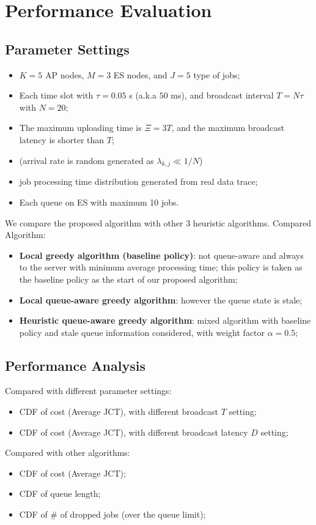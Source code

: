 \section{Performance Evaluation}

\subsection{Parameter Settings}
\begin{itemize}
    \item $K=5$ AP nodes, $M=3$ ES nodes, and $J=5$ type of jobs;
    \item Each time slot with $\tau=0.05$ s (a.k.a $50$ ms), and broadcast interval $T=N\tau$ with $N=20$;
    \item The maximum uploading time is $\Xi = 3 T$, and the maximum broadcast latency is shorter than $T$;
    \item (arrival rate is random generated as $\lambda_{k,j} \ll 1/N$)
    \item job processing time distribution generated from real data trace;
    \item Each queue on ES with maximum 10 jobs.
\end{itemize}

We compare the proposed algorithm with other 3 heuristic algorithms.
Compared Algorithm:
\begin{itemize}
    \item \textbf{Local greedy algorithm (baseline policy)}:
            not queue-aware and always to the server with minimum average processing time; this policy is taken as the baseline policy as the start of our proposed algorithm;
    \item \textbf{Local queue-aware greedy algorithm}:
            however the queue state is stale;
    \item \textbf{Heuristic queue-aware greedy algorithm}:
            mixed algorithm with baseline policy and stale queue information considered, with weight factor $\alpha = 0.5$;
\end{itemize}

\subsection{Performance Analysis}
Compared with different parameter settings:
\begin{itemize}
    \item CDF of cost (Average JCT), with different broadcast $T$ setting;
    \item CDF of cost (Average JCT), with different broadcast latency $D$ setting;
\end{itemize}

Compared with other algorithms:
\begin{itemize}
    \item CDF of cost (Average JCT);
    \item CDF of queue length;
    \item CDF of \# of dropped jobs (over the queue limit);
\end{itemize}